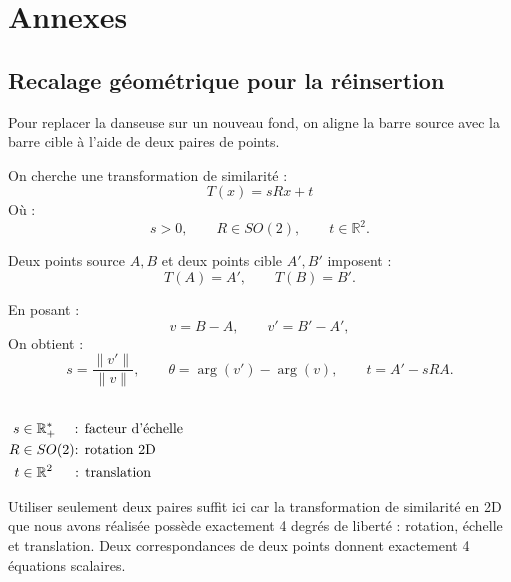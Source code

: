 \documentclass[11pt,a4paper]{article}
\begin{document}
\newpage
\appendix
\section{Annexes}

\subsection{Recalage géométrique pour la réinsertion}
Pour replacer la danseuse sur un nouveau fond, on aligne la barre source avec la barre cible à l'aide de deux paires de points.

On cherche une transformation de similarité :
\[
    T(x) = sRx + t
\]
Où :
\[
    s > 0,\qquad R \in SO(2),\qquad t \in \mathbb{R}^2.
\]

Deux points source \(A,B\) et deux points cible \(A',B'\) imposent :
\[
    T(A)=A',
    \qquad
    T(B)=B'.
\]

En posant :
\[
    v = B-A,
    \qquad
    v' = B'-A',
\]
On obtient :
\[
    s = \frac{\|v'\|}{\|v\|},
    \qquad
    \theta = \arg(v')-\arg(v),
    \qquad
    t = A' - sRA.
\]

\begin{center}
\\[-0.4em]
{\footnotesize
    \(
        \begin{aligned}
            s &\in \mathbb{R}^{*}_{+} \hspace{1.35em} \text{: facteur d'échelle} \\
            R &\in SO(2) \text{: rotation 2D} \\
            t &\in \mathbb{R}^2 \hspace{1.6em} \text{: translation}
        \end{aligned}
    \)
}
\end{center}

Utiliser seulement deux paires suffit ici car la transformation de similarité en 2D que nous avons réalisée possède exactement 4 degrés de liberté : rotation, échelle et translation.  
Deux correspondances de deux points donnent exactement 4 équations scalaires.
\end{document}
